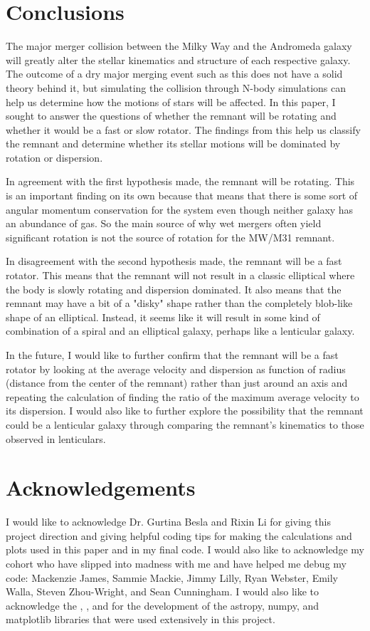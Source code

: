 \documentclass[twocolumn]{aastex63}
\begin{document}
\section{Conclusions} \label{sec:style}
The major merger collision between the Milky Way and the Andromeda galaxy will greatly alter the stellar kinematics and structure of each respective galaxy.  The outcome of a dry major merging event such as this does not have a solid theory behind it, but simulating the collision through N-body simulations can help us determine how the motions of stars will be affected.  In this paper, I sought to answer the questions of whether the remnant will be rotating and whether it would be a fast or slow rotator.  The findings from this help us classify the remnant and determine whether its stellar motions will be dominated by rotation or dispersion.

In agreement with the first hypothesis made, the remnant will be rotating.  This is an important finding on its own because that means that there is some sort of angular momentum conservation for the system even though neither galaxy has an abundance of gas. So the main source of why wet mergers often yield significant rotation is not the source of rotation for the MW/M31 remnant.

In disagreement with the second hypothesis made, the remnant will be a fast rotator.  This means that the remnant will not result in a classic elliptical where the body is slowly rotating and dispersion dominated.  It also means that the remnant may have a bit of a "disky" shape rather than the completely blob-like shape of an elliptical.  Instead, it seems like it will result in some kind of combination of a spiral and an elliptical galaxy, perhaps like a lenticular galaxy.

In the future, I would like to further confirm that the remnant will be a fast rotator by looking at the average velocity and dispersion as function of radius (distance from the center of the remnant) rather than just around an axis and repeating the calculation of finding the ratio of the maximum average velocity to its dispersion.  I would also like to further explore the possibility that the remnant could be a lenticular galaxy through comparing the remnant's kinematics to those observed in lenticulars.

\section{Acknowledgements} \label{sec:style}
I would like to acknowledge Dr. Gurtina Besla and Rixin Li for giving this project direction and giving helpful coding tips for making the calculations and plots used in this paper and in my final code.  I would also like to acknowledge my cohort who have slipped into madness with me and have helped me debug my code: Mackenzie James, Sammie Mackie, Jimmy Lilly, Ryan Webster, Emily Walla, Steven Zhou-Wright, and Sean Cunningham.  I would also like to acknowledge the \cite{ 2013A&A...558A..33A}, \cite{Hunter:2007}, and \cite{van_der_Walt_2011} for the development of the astropy, numpy, and matplotlib libraries that were used extensively in this project.


{}

\end{document}
